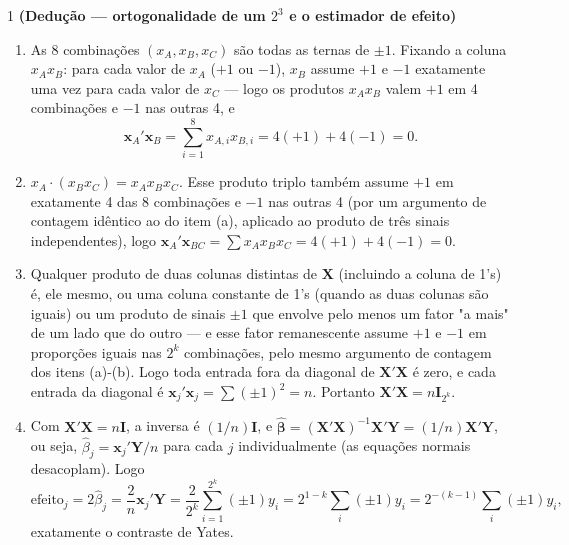 \documentclass[11pt]{article}
\begin{document}

\begin{questao}{1} \textbf{(Dedução --- ortogonalidade de um $2^3$ e o estimador de efeito)}
\end{questao}
\begin{solucao}
\begin{enumerate}[label=(\alph*)]
  \item As 8 combinações $(x_A,x_B,x_C)$ são todas as ternas de $\pm1$. Fixando a coluna
    $x_Ax_B$: para cada valor de $x_A$ ($+1$ ou $-1$), $x_B$ assume $+1$ e $-1$ exatamente uma
    vez para cada valor de $x_C$ --- logo os produtos $x_Ax_B$ valem $+1$ em 4 combinações e
    $-1$ nas outras 4, e
    $$\mathbf{x}_A'\mathbf{x}_B = \sum_{i=1}^{8} x_{A,i}x_{B,i} = 4(+1)+4(-1) = 0.$$
  \item $x_A\cdot(x_Bx_C) = x_A x_B x_C$. Esse produto triplo também assume $+1$ em exatamente 4
    das 8 combinações e $-1$ nas outras 4 (por um argumento de contagem idêntico ao do item (a),
    aplicado ao produto de três sinais independentes), logo
    $\mathbf{x}_A'\mathbf{x}_{BC} = \sum x_Ax_Bx_C = 4(+1)+4(-1)=0$.
  \item Qualquer produto de duas colunas distintas de $\mathbf{X}$ (incluindo a coluna de 1's) é,
    ele mesmo, ou uma coluna constante de 1's (quando as duas colunas são iguais) ou um produto de
    sinais $\pm1$ que envolve pelo menos um fator "a mais" de um lado que do outro --- e esse
    fator remanescente assume $+1$ e $-1$ em proporções iguais nas $2^k$ combinações, pelo mesmo
    argumento de contagem dos itens (a)-(b). Logo toda entrada fora da diagonal de
    $\mathbf{X}'\mathbf{X}$ é zero, e cada entrada da diagonal é
    $\mathbf{x}_j'\mathbf{x}_j = \sum(\pm1)^2 = n$. Portanto $\mathbf{X}'\mathbf{X} =
    n\mathbf{I}_{2^k}$.
  \item Com $\mathbf{X}'\mathbf{X}=n\mathbf{I}$, a inversa é $(1/n)\mathbf{I}$, e
    $\hat{\boldsymbol\beta} = (\mathbf{X}'\mathbf{X})^{-1}\mathbf{X}'\mathbf{Y} =
    (1/n)\mathbf{X}'\mathbf{Y}$, ou seja, $\hat\beta_j = \mathbf{x}_j'\mathbf{Y}/n$ para cada $j$
    individualmente (as equações normais desacoplam). Logo
    $$\text{efeito}_j = 2\hat\beta_j = \frac{2}{n}\mathbf{x}_j'\mathbf{Y} =
    \frac{2}{2^k}\sum_{i=1}^{2^k}(\pm1)y_i = 2^{1-k}\sum_i(\pm1)y_i = 2^{-(k-1)}\sum_i(\pm1)y_i,$$
    exatamente o contraste de Yates.
\end{enumerate}
\end{solucao}
\end{document}
